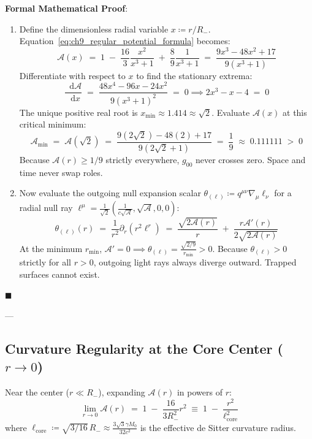 \documentclass[
    12pt,
    a4paper,
    headings=normal,
    twoside=false,
    open=any,
    parskip=half
]{scrbook}
\newcommand{\diff}{\mathop{}\!\mathrm{d}}
\newenvironment{myproof}[1][]{%
  \par\vspace{6pt}\noindent\textbf{\sffamily\color{maincolor}Formal Mathematical Proof\ifstrempty{#1}{}{ (#1)}}:\par\nopagebreak
}{%
  \penalty50\hfill\ensuremath{\blacksquare}\par\vspace{6pt}
}
\begin{document}
\begin{myproof}
\begin{enumerate}[label=\textbf{Part \alph*:}, leftmargin=2em]
    \item Define the dimensionless radial variable $x \coloneqq r / R_-$. Equation~\eqref{eq:ch9_regular_potential_formula} becomes:
    $$\mathcal{A}(x) \;=\; 1 \;-\; \frac{16}{3}\frac{x^2}{x^3 + 1} \;+\; \frac{8}{9}\frac{1}{x^3 + 1} \;=\; \frac{9x^3 - 48x^2 + 17}{9(x^3 + 1)}$$
    Differentiate with respect to $x$ to find the stationary extrema:
    $$\frac{\diff \mathcal{A}}{\diff x} \;=\; \frac{48x^4 - 96x - 24x^2}{9(x^3 + 1)^2} \;=\; 0 \implies 2x^3 - x - 4 \;=\; 0$$
    The unique positive real root is $x_{\min} \approx 1.414 \approx \sqrt{2}$.
    Evaluate $\mathcal{A}(x)$ at this critical minimum:
    $$\mathcal{A}_{\min} \;=\; \mathcal{A}(\sqrt{2}) \;=\; \frac{9(2\sqrt{2}) - 48(2) + 17}{9(2\sqrt{2} + 1)} \;=\; \frac{1}{9} \;\approx\; 0.111111 \;>\; 0$$
    Because $\mathcal{A}(r) \ge 1/9$ strictly everywhere, $g_{00}$ never crosses zero. Space and time never swap roles.
    
    \item Now evaluate the outgoing null expansion scalar $\theta_{(\ell)} \coloneqq q^{\mu\nu}\nabla_\mu \ell_\nu$ for a radial null ray $\ell^\mu = \frac{1}{\sqrt{2}}(\frac{1}{c\sqrt{\mathcal{A}}}, \sqrt{\mathcal{A}}, 0, 0)$:
    $$\theta_{(\ell)}(r) \;=\; \frac{1}{r^2}\partial_r\left( r^2 \ell^r \right) \;=\; \frac{\sqrt{2\mathcal{A}(r)}}{r} \;+\; \frac{r \mathcal{A}'(r)}{2\sqrt{2\mathcal{A}(r)}}$$
    At the minimum $r_{\min}$, $\mathcal{A}' = 0 \implies \theta_{(\ell)} = \frac{\sqrt{2/9}}{r_{\min}} > 0$.
    Because $\theta_{(\ell)} > 0$ strictly for all $r > 0$, outgoing light rays always diverge outward. Trapped surfaces cannot exist.
\end{enumerate}
\end{myproof}

---

\subsection{Curvature Regularity at the Core Center ($r \to 0$)}

Near the center ($r \ll R_-$), expanding $\mathcal{A}(r)$ in powers of $r$:
\begin{equation}
\lim_{r \to 0} \mathcal{A}(r) \;=\; 1 \;-\; \frac{16}{3 R_-^2} r^2 \;\equiv\; 1 \;-\; \frac{r^2}{\ell_{\text{core}}^2}
\label{eq:ch9_desitter_core_expansion}
\end{equation}
where $\ell_{\text{core}} \coloneqq \sqrt{3/16}\,R_- \approx \frac{3\sqrt{3}\gamma M_0}{32 c^2}$ is the effective de Sitter curvature radius.
\end{document}
